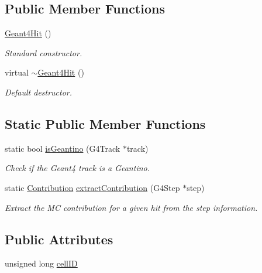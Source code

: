 \subsection*{Public Member Functions}
\begin{DoxyCompactItemize}
\item 
\hyperlink{class_d_d4hep_1_1_simulation_1_1_geant4_hit_a45eca144a88d313ce22aeaff75dedce1}{Geant4\+Hit} ()
\begin{DoxyCompactList}\small\item\em Standard constructor. \end{DoxyCompactList}\item 
virtual \hyperlink{class_d_d4hep_1_1_simulation_1_1_geant4_hit_a26ed0cb1e754012a586523a107e9bc7c}{$\sim$\+Geant4\+Hit} ()
\begin{DoxyCompactList}\small\item\em Default destructor. \end{DoxyCompactList}\end{DoxyCompactItemize}
\subsection*{Static Public Member Functions}
\begin{DoxyCompactItemize}
\item 
static bool \hyperlink{class_d_d4hep_1_1_simulation_1_1_geant4_hit_a4849a8685e28342d97aff6166a2f348d}{is\+Geantino} (G4\+Track $\ast$track)
\begin{DoxyCompactList}\small\item\em Check if the Geant4 track is a Geantino. \end{DoxyCompactList}\item 
static \hyperlink{class_d_d4hep_1_1_simulation_1_1_geant4_hit_a03a5270c4d1410302fe278ce6a47f268}{Contribution} \hyperlink{class_d_d4hep_1_1_simulation_1_1_geant4_hit_a9ff079cd95ab9c22abca994fcdc31d97}{extract\+Contribution} (G4\+Step $\ast$step)
\begin{DoxyCompactList}\small\item\em Extract the MC contribution for a given hit from the step information. \end{DoxyCompactList}\end{DoxyCompactItemize}
\subsection*{Public Attributes}
\begin{DoxyCompactItemize}
\item 
unsigned long \hyperlink{class_d_d4hep_1_1_simulation_1_1_geant4_hit_a4ad2477cc6b2280300970d709190174d}{cell\+ID}
\end{DoxyCompactItemize}


